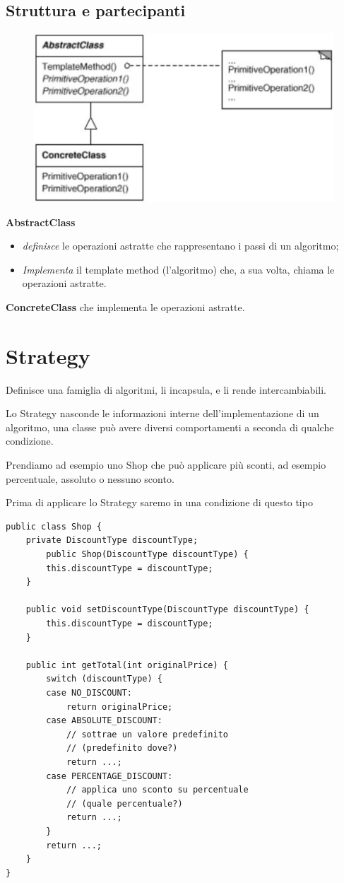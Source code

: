 \subsection{Struttura e partecipanti}

\begin{figure}[H]
    \centering
    \includegraphics[width=0.4\linewidth]{../../immagini/templateMethod_Strategy/struttura_templateMethod}    
\end{figure}

\textbf{AbstractClass} 

\begin{itemize}
    \item \textit{definisce} le operazioni astratte che rappresentano i passi di un algoritmo;
    \item \textit{Implementa} il template method (l’algoritmo) che, a sua volta, chiama le operazioni astratte.
\end{itemize}

\textbf{ConcreteClass} che implementa le operazioni astratte.

\section{Strategy}

Definisce una famiglia di algoritmi, li incapsula, e li rende intercambiabili.

Lo Strategy nasconde le informazioni interne dell’implementazione di un algoritmo, una classe può avere diversi comportamenti a seconda di qualche condizione.

Prendiamo ad esempio uno Shop che può applicare più sconti, ad esempio percentuale, assoluto o nessuno sconto.

Prima di applicare lo Strategy saremo in una condizione di questo tipo
\begin{lstlisting}
public class Shop {
    private DiscountType discountType;
        public Shop(DiscountType discountType) {
        this.discountType = discountType;
    }

    public void setDiscountType(DiscountType discountType) {
        this.discountType = discountType;
    }

    public int getTotal(int originalPrice) {
        switch (discountType) {
        case NO_DISCOUNT:
            return originalPrice;
        case ABSOLUTE_DISCOUNT:
            // sottrae un valore predefinito
            // (predefinito dove?)
            return ...;
        case PERCENTAGE_DISCOUNT:
            // applica uno sconto su percentuale
            // (quale percentuale?)
            return ...;
        }
        return ...;
    }
}
\end{lstlisting}

